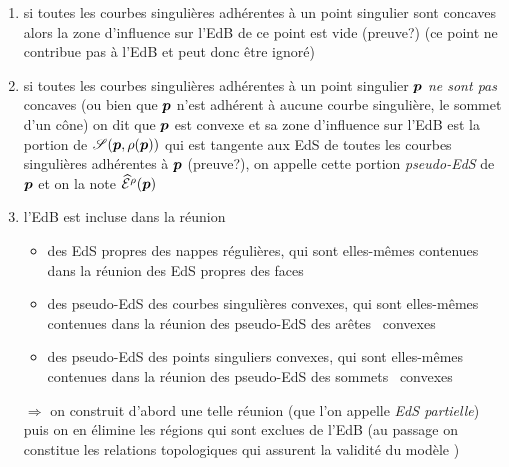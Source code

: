 \begin{enumerate}
	\item si toutes les courbes singulières adhérentes à un point singulier sont concaves alors la zone d'influence sur l'EdB de ce point est vide (preuve?) (\ie ce point ne contribue pas à l'EdB et peut donc être ignoré)
	\item si toutes les courbes singulières adhérentes à un point singulier $\bm{p}$ \textit{ne sont pas} concaves (ou bien que $\bm{p}$ n'est adhérent à aucune courbe singulière, \eg le sommet d'un cône) on dit que $\bm{p}$ est convexe et sa zone d'influence sur l'EdB est la portion de $\sphere[\p][\rho(\p)]$ qui est tangente aux EdS de toutes les courbes singulières adhérentes à $\bm{p}$ (preuve?), on appelle cette portion \textit{pseudo-EdS} de $\bm{p}$ et on la note $\widehat{\mathcal{E}}^{\rho}({\bm{p}})$
	\item l'EdB est incluse dans la réunion
	\begin{itemize}
		\item des EdS propres des nappes régulières, qui sont elles-mêmes contenues dans la réunion des EdS propres des faces \brep
		\item des pseudo-EdS des courbes singulières convexes, qui sont elles-mêmes contenues dans la réunion des pseudo-EdS des arêtes \brep\ convexes
		\item des pseudo-EdS des points singuliers convexes, qui sont elles-mêmes contenues dans la réunion des pseudo-EdS des sommets \brep\ convexes
	\end{itemize}
	\item[$\Rightarrow$] on construit d'abord une telle réunion (que l'on appelle \textit{EdS partielle}) puis on en élimine les régions qui sont exclues de l'EdB (au passage on constitue les relations topologiques qui assurent la validité du modèle \brep)
\end{enumerate}



